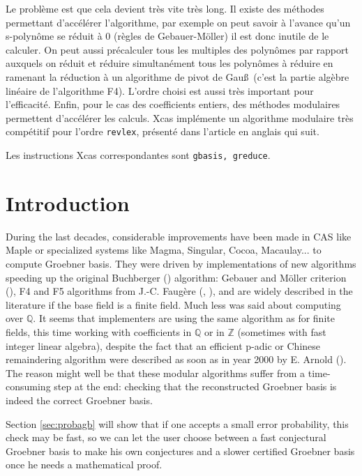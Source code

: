 \documentclass[a4paper,11pt]{book}
\begin{document}
\begin{giacjshere}
Le problème est que cela devient très vite très long. Il existe
des méthodes permettant d'accélérer l'algorithme, par exemple
on peut savoir à l'avance qu'un s-polynôme se réduit à 0
(règles de Gebauer-Möller) il est donc inutile de le calculer.
On peut aussi précalculer tous les multiples des polynômes
par rapport auxquels on réduit et réduire simultanément
tous les polynômes à réduire en ramenant la réduction
à un algorithme de pivot de Gau\ss\ (c'est la partie
algèbre linéaire de l'algorithme F4). L'ordre choisi
est aussi très important pour l'efficacité. Enfin, pour le cas des
coefficients entiers, des méthodes modulaires permettent
d'accélérer les calculs. Xcas implémente un algorithme modulaire
très compétitif pour l'ordre {\tt revlex}, présenté
dans l'article en anglais qui suit.

Les instructions Xcas correspondantes sont {\tt gbasis, greduce}.



\section{Introduction}
During the last decades, considerable improvements have been made 
in CAS like Maple or specialized systems like Magma, Singular, 
Cocoa, Macaulay... to compute Groebner basis. 
They were driven by
implementations of new algorithms speeding up the original Buchberger 
(\cite{buchberger1985grobner})
algorithm: Gebauer and M\"oller criterion (\cite{Gebauer1988275}), F4 and F5
algorithms from J.-C. Faug\`ere (\cite{F99a}, \cite{Fau02a}), and are widely described in the
literature if the base field is a finite field.
Much less was said about computing over $\mathbb{Q}$. It seems that
implementers are using the same algorithm as for finite fields,
this time working with coefficients in $\mathbb{Q}$ or in $\mathbb{Z}$ (sometimes
with fast integer linear algebra), 
despite the fact that an efficient p-adic or Chinese remaindering
algorithm were described as soon as in year 2000 by E. Arnold
(\cite{Arnold2003403}). 
The reason might well be that these modular algorithms suffer from a
time-consuming step at the end: checking that the reconstructed
Groebner basis is indeed the correct Groebner basis.

Section \ref{sec:probagb}
will show that if one accepts a small error probability, this check 
may be fast, so we can let the user choose between a fast conjectural
Groebner basis to make his own conjectures and a slower certified
Groebner basis once he needs a mathematical proof.


\end{giacjshere}
\end{document}
